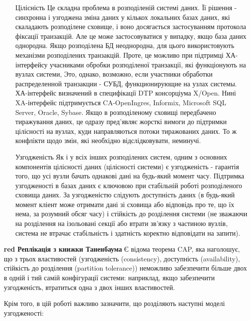 \documentclass[14pt]{vakthesis}
\begin{document}
\begin{itemize}
\item[Цілісність] Це складна проблема в розподіленій системі даних. Її рішення - синхронна і узгоджена зміна даних у кількох локальних базах даних, які скаладають розподілене сховище, і воно досягається застосуванням протокола фіксації транзакцій. Але це може застосовуватися у випадку, якщо база даних однородна. Якщо розподілена БД неоднородна, для цього використовують механізми розподілених транзакцій. Проте, це можливо при підтримці ХА-інтерфейсу учасниками обробки розподіленої транзакції, які функціонують на вузлах системи,   Это, однако, возможно, если участники обработки распределенной транзакции - СУБД, функционирующие на узлах системы. ХА-інтерфейс визначений в специфікації DTP консорціума X/Open. Нині XA-інтерфейс підтримується CA-OpenIngres, Informix, Microsoft SQL Server, Oracle, Sybase.
Якщо в розподіленому сховищі передбачено тиражування даних, це одразу пред'являє жорсткі  вимоги до підтримки цілісності на вузлах, куди направляються потоки тиражованих даних. То ж конфлікти щодо змін, які необхідно відслідковувати, неминучі. 
\item[Узгодженість] Як і у всіх інших розподілених систем, одним з основних компонентів цілісності даних (цілісності системи) є узгодженість - гарантія того, що усі вузли бачать однакові дані на будь-який момент часу.
Підтримка узгодженості в базах даних є ключовою при стабільній роботі розподіленого сховища даних. 
За узгодженістю слідують доступність даних (в будь-який момент кліент може отримати дані зі сховища або відповідь про те, що їх нема, за розумний обсяг часу) і стійкість до розділення системи (не зважаючи на розділення на ізольовані секції або втрати зв'язку з частиною вузлів, система не втрачає стабільність і здатність коректно відповідати на запити).

\end{itemize}

{\bfseries{red} Реплікація з книжки Таненбаума}
Є відома теорема CAP, яка наголошує, що з трьох властивостей (узгодженість (consistency), доступність (availability), стійкість до розділення (partition tolerance)) неможливо забезпечити більше двох в одній і тий самій конфігурації системи: наприклад, якщо забезпечити узгодженість, втратиться одна з двох інших властивостей. 

Крім того, в цій роботі важливо зазначити, що розділяють наступні моделі узгодженості:
\end{document}
